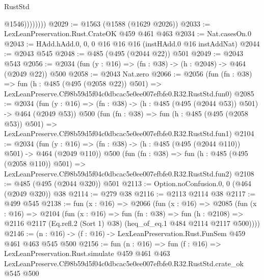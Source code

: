 \begin{lexlean}{RustStd}
\begin{coremodule}
                    @1546))))))))
@2029 := @1563 (@1588 (@1629 @2026))
@2033 := LexLeanPreservation.Rust.CrateOK @459 @461 @463
@2034 := Nat.casesOn.{0}
@2043 := HAdd.hAdd.{0, 0, 0} @16 @16 @16 (instHAdd.{0} @16 instAddNat)
@2044 := @2043 @545
@2048 := @485 (@495 (@2044 @22)) @501
@2049 := @2043 @543
@2056 := @2034 (fun (y : @16) => (fn : @38) -> (h : @2048) -> @464 (@2049 @22)) @500
@2058 := @2043 Nat.zero
@2066 := @2056
    (fun (fn : @38) =>
    fun (h : @485 (@495 (@2058 @22)) @501) =>
    LexLeanPreserve.Cf98b59d5f04c0dbcac5e0ee007efbfe0.R32.RustStd.fun0)
@2085 := @2034
    (fun (y : @16) => (fn : @38) -> (h : @485 (@495 (@2044 @53)) @501) -> @464 (@2049 @53))
    @500
    (fun (fn : @38) =>
    fun (h : @485 (@495 (@2058 @53)) @501) =>
    LexLeanPreserve.Cf98b59d5f04c0dbcac5e0ee007efbfe0.R32.RustStd.fun1)
@2104 := @2034
    (fun (y : @16) => (fn : @38) -> (h : @485 (@495 (@2044 @110)) @501) -> @464 (@2049 @110))
    @500
    (fun (fn : @38) =>
    fun (h : @485 (@495 (@2058 @110)) @501) =>
    LexLeanPreserve.Cf98b59d5f04c0dbcac5e0ee007efbfe0.R32.RustStd.fun2)
@2108 := @485 (@495 (@2044 @320)) @501
@2113 := Option.noConfusion.{0, 0} (@464 (@2049 @320)) @38
@2114 := @279 @38
@2116 := @2113 @2114 @38
@2117 := @499 @545
@2138 := fun (x : @16) =>
  @2066
    (fun (x : @16) =>
    @2085
      (fun (x : @16) =>
      @2104
        (fun (x : @16) =>
        fun (fn : @38) =>
        fun (h : @2108) =>
        @2116 @2117 (Eq.refl.{2} (Sort 1) @38) (heq_of_eq.{1} @484 @2114 @2117 @500))))
@2146 := (n : @16) -> (f : @16) -> LexLeanPreservation.Rust.FunSem @459 @461 @463 @545 @500
@2156 := fun (n : @16) =>
  fun (f : @16) =>
  LexLeanPreservation.Rust.simulate
    @459
    @461
    @463
    LexLeanPreserve.Cf98b59d5f04c0dbcac5e0ee007efbfe0.R32.RustStd.crate_ok
    @545
    @500
\end{coremodule}
\end{lexlean}
